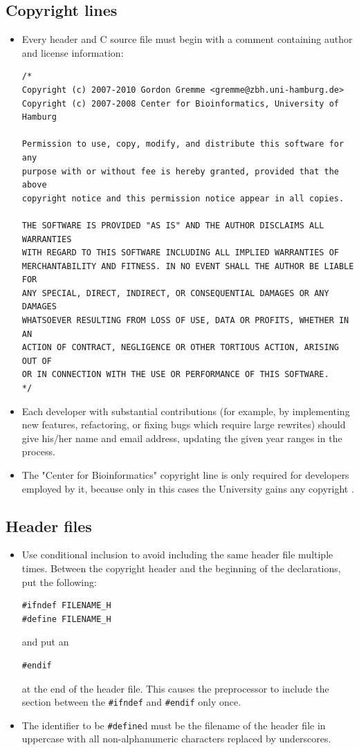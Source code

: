 \documentclass[11pt,final]{article}
\newcommand{\keyword}[1]{\lstinline{#1}}
\begin{document}
\subsection{Copyright lines}
\label{copyright}
\begin{itemize}
\item
Every header and C source file must begin with a comment containing author and
license information:
\begin{lstlisting}
/*
Copyright (c) 2007-2010 Gordon Gremme <gremme@zbh.uni-hamburg.de>
Copyright (c) 2007-2008 Center for Bioinformatics, University of Hamburg

Permission to use, copy, modify, and distribute this software for any
purpose with or without fee is hereby granted, provided that the above
copyright notice and this permission notice appear in all copies.

THE SOFTWARE IS PROVIDED "AS IS" AND THE AUTHOR DISCLAIMS ALL WARRANTIES
WITH REGARD TO THIS SOFTWARE INCLUDING ALL IMPLIED WARRANTIES OF
MERCHANTABILITY AND FITNESS. IN NO EVENT SHALL THE AUTHOR BE LIABLE FOR
ANY SPECIAL, DIRECT, INDIRECT, OR CONSEQUENTIAL DAMAGES OR ANY DAMAGES
WHATSOEVER RESULTING FROM LOSS OF USE, DATA OR PROFITS, WHETHER IN AN
ACTION OF CONTRACT, NEGLIGENCE OR OTHER TORTIOUS ACTION, ARISING OUT OF
OR IN CONNECTION WITH THE USE OR PERFORMANCE OF THIS SOFTWARE.
*/
\end{lstlisting}
\item
Each developer with substantial contributions (for example, by implementing new
features, refactoring, or fixing bugs which require large rewrites) should
give his/her name and email address, updating the given year ranges in the
process.
\item The "Center for Bioinformatics" copyright line is only required for
developers employed by it, because only in this cases the University gains any
copyright .
\end{itemize}

\subsection{Header files}
\begin{itemize}
\item
Use conditional inclusion to avoid including the same header file multiple
times. Between the copyright header and the beginning of the declarations, put
the following:
\begin{lstlisting}
#ifndef FILENAME_H
#define FILENAME_H
\end{lstlisting}
and put an
\begin{lstlisting}
#endif
\end{lstlisting}
at the end of the header file.
This causes the preprocessor to include the section between the
\keyword{#ifndef} and \keyword{#endif} only once.
\item
The identifier to be \keyword{#define}d must be the filename of the header
file in uppercase with all non-alphanumeric characters replaced by underscores.
\end{itemize}
\end{document}
